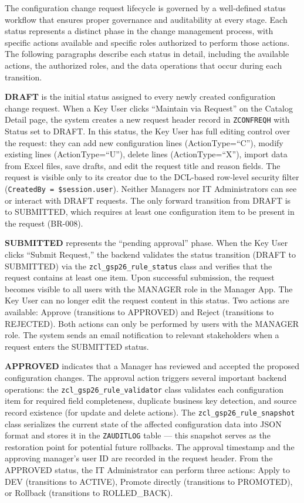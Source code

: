 \documentclass[12pt,a4paper]{report}
\begin{document}
The configuration change request lifecycle is governed by a well-defined status workflow that ensures proper governance and auditability at every stage. Each status represents a distinct phase in the change management process, with specific actions available and specific roles authorized to perform those actions. The following paragraphs describe each status in detail, including the available actions, the authorized roles, and the data operations that occur during each transition.

\textbf{DRAFT} is the initial status assigned to every newly created configuration change request. When a Key User clicks ``Maintain via Request'' on the Catalog Detail page, the system creates a new request header record in \texttt{ZCONFREQH} with Status set to DRAFT. In this status, the Key User has full editing control over the request: they can add new configuration lines (ActionType=``C''), modify existing lines (ActionType=``U''), delete lines (ActionType=``X''), import data from Excel files, save drafts, and edit the request title and reason fields. The request is visible only to its creator due to the DCL-based row-level security filter (\texttt{CreatedBy = \$session.user}). Neither Managers nor IT Administrators can see or interact with DRAFT requests. The only forward transition from DRAFT is to SUBMITTED, which requires at least one configuration item to be present in the request (BR-008).

\textbf{SUBMITTED} represents the ``pending approval'' phase. When the Key User clicks ``Submit Request,'' the backend validates the status transition (DRAFT to SUBMITTED) via the \texttt{zcl\_gsp26\_rule\_status} class and verifies that the request contains at least one item. Upon successful submission, the request becomes visible to all users with the MANAGER role in the Manager App. The Key User can no longer edit the request content in this status. Two actions are available: Approve (transitions to APPROVED) and Reject (transitions to REJECTED). Both actions can only be performed by users with the MANAGER role. The system sends an email notification to relevant stakeholders when a request enters the SUBMITTED status.

\textbf{APPROVED} indicates that a Manager has reviewed and accepted the proposed configuration changes. The approval action triggers several important backend operations: the \texttt{zcl\_gsp26\_rule\_validator} class validates each configuration item for required field completeness, duplicate business key detection, and source record existence (for update and delete actions). The \texttt{zcl\_gsp26\_rule\_snapshot} class serializes the current state of the affected configuration data into JSON format and stores it in the \texttt{ZAUDITLOG} table --- this snapshot serves as the restoration point for potential future rollbacks. The approval timestamp and the approving manager's user ID are recorded in the request header. From the APPROVED status, the IT Administrator can perform three actions: Apply to DEV (transitions to ACTIVE), Promote directly (transitions to PROMOTED), or Rollback (transitions to ROLLED\_BACK).
\end{document}
